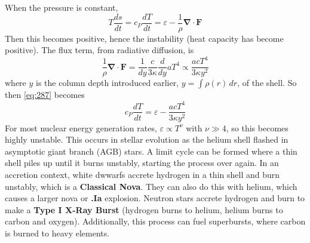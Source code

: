 \documentclass[10pt]{article}
\numberwithin{equation}{section}
\newcommand{\n}{\noindent}
\begin{document}
    \n When the pressure is constant, 
    \begin{equation}
      \label{eq:286}
      T\frac{ds}{dt}=c_P\frac{dT}{dt}=\varepsilon-\frac{1}{\rho}\bm{\nabla}\cdot\mathbf{F}
    \end{equation}
    Then this becomes positive, hence the instability (heat capacity
    has become positive). The flux term, from radiative diffusion, is
    \begin{equation}
      \label{eq:287}
      \frac{1}{\rho}\bm{\nabla}\cdot\mathbf{F}=\frac{1}{dy}\frac{c}{3\kappa}\frac{d}{dy}aT^4\propto
      \frac{ac T^4}{3\kappa y^2}
    \end{equation}
    where $y$ is the column depth introduced earlier, $y=\int
    \rho(r)\,dr$, of the shell. So then \eqref{eq:287} becomes
    \begin{equation}
      \label{eq:288}
      c_P\frac{dT}{dt}=\varepsilon-\frac{acT^4}{3\kappa y^2}
    \end{equation}
    For most nuclear energy generation rates, $\varepsilon\propto
    T^\nu$ with $\nu \gg 4$, so this becomes highly unstable. This
    occurs in stellar evolution as the helium shell flashed in
    asymptotic giant branch (AGB) stars. A limit cycle can be formed
    where a thin shell piles up until it burns unstably, starting the
    process over again. In an accretion context, white dwwarfs accrete
    hydrogen in a thin shell and burn unstably, which is a
    \textbf{Classical Nova}. They can also do this with helium, which
    causes a larger nova or \textbf{.Ia} explosion. Neutron stars
    accrete hydrogen and burn to make a \textbf{Type I X-Ray Burst}
    (hydrogen burns to helium, helium burns to carbon and
    oxygen). Additionally, this process can fuel superbursts, where
    carbon is burned to heavy elements.\\
\end{document}
